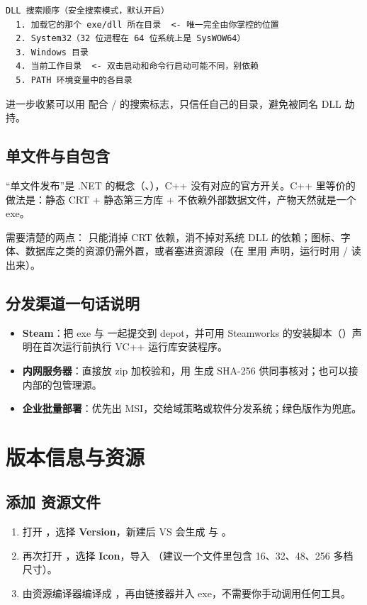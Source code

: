 \begin{lstlisting}[style=textstyle]
DLL 搜索顺序（安全搜索模式，默认开启）
  1. 加载它的那个 exe/dll 所在目录  <- 唯一完全由你掌控的位置
  2. System32（32 位进程在 64 位系统上是 SysWOW64）
  3. Windows 目录
  4. 当前工作目录  <- 双击启动和命令行启动可能不同，别依赖
  5. PATH 环境变量中的各目录
\end{lstlisting}

进一步收紧可以用  配合  /  的搜索标志，只信任自己的目录，避免被同名 DLL 劫持。
\subsection{单文件与自包含}
“单文件发布”是 .NET 的概念（、），C++ 没有对应的官方开关。C++ 里等价的做法是：静态 CRT + 静态第三方库 + 不依赖外部数据文件，产物天然就是一个 exe。

需要清楚的两点： 只能消掉 CRT 依赖，消不掉对系统 DLL 的依赖；图标、字体、数据库之类的资源仍需外置，或者塞进资源段（在  里用  声明，运行时用  /  读出来）。
\subsection{分发渠道一句话说明}
\begin{itemize}
  \item \textbf{Steam}：把 exe 与  一起提交到 depot，并可用 Steamworks 的安装脚本（）声明在首次运行前执行 VC++ 运行库安装程序。
  \item \textbf{内网服务器}：直接放 zip 加校验和，用  生成 SHA-256 供同事核对；也可以接内部的包管理源。
  \item \textbf{企业批量部署}：优先出 MSI，交给域策略或软件分发系统；绿色版作为兜底。
\end{itemize}
\section{版本信息与资源}
\subsection{添加  资源文件}
\begin{enumerate}
  \item 打开 ，选择 \textbf{Version}，新建后 VS 会生成  与 。
  \item 再次打开 ，选择 \textbf{Icon}，导入 （建议一个文件里包含 16、32、48、256 多档尺寸）。
  \item {} 由资源编译器编译成 ，再由链接器并入 exe，不需要你手动调用任何工具。
\end{enumerate}
